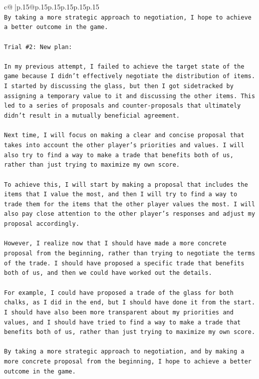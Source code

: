 \documentclass{article}
\begin{document}
{\begin{supertabular}{c@{$\;$}|p{.15\linewidth}@{}p{.15\linewidth}p{.15\linewidth}p{.15\linewidth}p{.15\linewidth}p{.15\linewidth}}
{{{\\ 
\texttt{By taking a more strategic approach to negotiation, I hope to achieve a better outcome in the game.} \\
\\ 
\texttt{Trial \#2: New plan: } \\
\\ 
\texttt{In my previous attempt, I failed to achieve the target state of the game because I didn't effectively negotiate the distribution of items. I started by discussing the glass, but then I got sidetracked by assigning a temporary value to it and discussing the other items. This led to a series of proposals and counter{-}proposals that ultimately didn't result in a mutually beneficial agreement.} \\
\\ 
\texttt{Next time, I will focus on making a clear and concise proposal that takes into account the other player's priorities and values. I will also try to find a way to make a trade that benefits both of us, rather than just trying to maximize my own score.} \\
\\ 
\texttt{To achieve this, I will start by making a proposal that includes the items that I value the most, and then I will try to find a way to trade them for the items that the other player values the most. I will also pay close attention to the other player's responses and adjust my proposal accordingly.} \\
\\ 
\texttt{However, I realize now that I should have made a more concrete proposal from the beginning, rather than trying to negotiate the terms of the trade. I should have proposed a specific trade that benefits both of us, and then we could have worked out the details.} \\
\\ 
\texttt{For example, I could have proposed a trade of the glass for both chalks, as I did in the end, but I should have done it from the start. I should have also been more transparent about my priorities and values, and I should have tried to find a way to make a trade that benefits both of us, rather than just trying to maximize my own score.} \\
\\ 
\texttt{By taking a more strategic approach to negotiation, and by making a more concrete proposal from the beginning, I hope to achieve a better outcome in the game.} \\
\\ 
}}}
\end{supertabular}}
\end{document}
